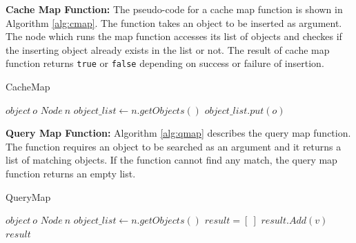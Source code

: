 \documentclass[9.5pt,journal,final,finalsubmission,twocolumn]{IEEEtran}
\begin{document}
\textbf{Cache Map Function:} The pseudo-code for a cache map function is shown in 
Algorithm \ref{alg:cmap}.
The function takes an object to be inserted
as argument.
The node which runs the map function accesses its list of objects and
checkes if the inserting object already exists in the list or not.
The result of cache map function returns \texttt{true} or \texttt{false}
depending on success or failure of insertion.
\begin{algorithm}
\caption{CacheMap}
\label{alg:cmap}
\begin{algorithmic}[1]
\REQUIRE $object~ o$     
\REQUIRE $Node~ n$
\STATE $object\_list \leftarrow n.getObjects()$ %
  \STATE $object\_list.put(o)$
  \RETURN \TRUE
\ELSE
  \RETURN \FALSE
\ENDIF
\end{algorithmic}
\end{algorithm}

\textbf{Query Map Function:} Algorithm \ref{alg:qmap} describes the query 
map function. The function requires an object to be searched as an argument
and it returns a list of matching objects. If the function cannot find
any match, the query map function returns an empty list.
\begin{algorithm}
\caption{QueryMap}
\label{alg:qmap}
\begin{algorithmic}[1]
\REQUIRE $object~ o$     
\REQUIRE $Node~ n$
\STATE $object\_list \leftarrow n.getObjects()$ %
\STATE $result = [~]$
    \STATE $result.Add(v)$
  \ENDIF
\ENDFOR
\RETURN $result$
\end{algorithmic}
\end{algorithm}
%
\end{document}
